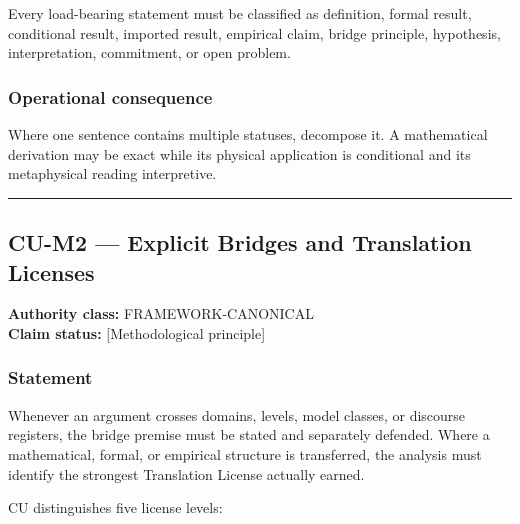 \documentclass[
  11pt,
]{article}
\begin{document}
Every load-bearing statement must be classified as definition, formal
result, conditional result, imported result, empirical claim, bridge
principle, hypothesis, interpretation, commitment, or open problem.

\subsubsection{Operational consequence}\label{operational-consequence-9}

Where one sentence contains multiple statuses, decompose it. A
mathematical derivation may be exact while its physical application is
conditional and its metaphysical reading interpretive.

\begin{center}\rule{0.5\linewidth}{0.5pt}\end{center}

\subsection{CU-M2 --- Explicit Bridges and Translation
Licenses}\label{cu-m2-explicit-bridges-and-translation-licenses}

\textbf{Authority class:} FRAMEWORK-CANONICAL\\
\textbf{Claim status:} {[}Methodological principle{]}

\subsubsection{Statement}\label{statement-10}

Whenever an argument crosses domains, levels, model classes, or
discourse registers, the bridge premise must be stated and separately
defended. Where a mathematical, formal, or empirical structure is
transferred, the analysis must identify the strongest Translation
License actually earned.

CU distinguishes five license levels:
\end{document}
